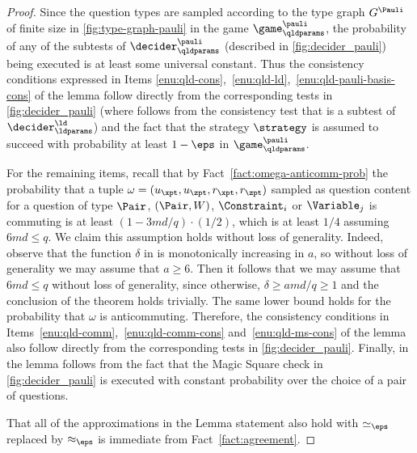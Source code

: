 \begin{proof}
	Since the question types are sampled according to the type graph $G^\Pauli$ of
  finite size in \cref{fig:type-graph-pauli} in the game
  $\game^\pauli_\qldparams$, the probability of any of the subtests of
  $\decider^\pauli_\qldparams$ (described in \cref{fig:decider_pauli})
  being executed is at least some universal constant.
  Thus the consistency conditions expressed in Items
  \ref{enu:qld-cons},~\ref{enu:qld-ld},~\ref{enu:qld-pauli-basis-cons} of the
  lemma follow directly from the corresponding tests in
  \cref{fig:decider_pauli} (where  follows from the
  consistency test that is a subtest of $\decider^\ld_\ldparams$) and the fact
  that the strategy $\strategy$ is assumed to succeed with probability at least
  $1 - \eps$ in $\game^\pauli_\qldparams$.
				
  For the remaining items, recall that by Fact~\ref{fact:omega-anticomm-prob}
  the probability that a tuple $\omega=(u_\xpt,u_\zpt,r_\xpt,r_\zpt)$ sampled as
  question content for a question of type $\Pair$, $(\Pair,W)$, $\Constraint_i$
  or $\Variable_j$ is commuting is at least $(1 - 3md/q) \cdot (1/2)$, which is
  at least $1/4$ assuming $6md \leq q$. We claim this assumption holds
  without loss of generality. Indeed, observe that the function
  $\delta$ in  is monotonically increasing in $a$, so without loss of generality we may assume that $a
  \geq 6$.  Then it follows that we may assume that $6md \leq q$
  without loss of generality, since otherwise, $\delta \geq a md /q
  \geq 1$ and the conclusion of the theorem holds trivially.
  The same lower bound holds for the probability that $\omega$ is anticommuting.
  Therefore, the consistency conditions in
  Items~\ref{enu:qld-comm},~\ref{enu:qld-comm-cons} and~\ref{enu:qld-ms-cons} of
  the lemma also follow directly from the corresponding tests in
  \cref{fig:decider_pauli}.
  Finally,  in the lemma follows from the fact that the Magic
  Square check in \cref{fig:decider_pauli} is executed with constant probability
  over the choice of a pair of questions.
				
That all of the approximations in the Lemma statement also hold with
$\simeq_\eps$ replaced by $\approx_\eps$ is immediate from Fact~\ref{fact:agreement}.
\end{proof}


